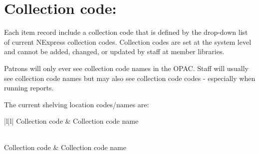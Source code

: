 \documentclass[letterpaper,10pt,english]{sphinxmanual}
\begin{document}
\section{Collection code:}
\label{\detokenize{classification:collection-code}}
Each item record  include a collection code that is defined by
the drop-down list of current NExpress collection codes. Collection
codes are set at the system level and cannot be added, changed, or
updated by staff at member libraries.

Patrons will only ever see collection code names in the OPAC. Staff will
usually see collection code names but may also see collection code codes
- especially when running reports.

The current shelving location codes/names are:


\begin{savenotes}\sphinxatlongtablestart\begin{longtable}{|l|l|}
\hline
\sphinxstyletheadfamily 
Collection code
&\sphinxstyletheadfamily 
Collection code name
\\
\hline
\endfirsthead

%
{}\\
\hline
\sphinxstyletheadfamily 
Collection code
&\sphinxstyletheadfamily 
Collection code name
\\
\hline
\endhead

\hline
{}\\
\endfoot

\endlastfoot


\end{longtable}
\end{savenotes}
\end{document}
